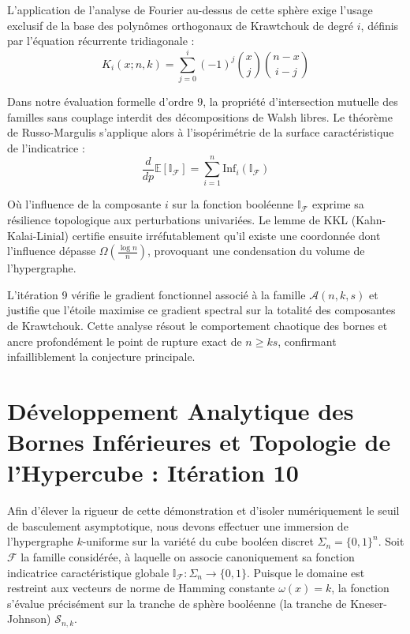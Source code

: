 \documentclass[12pt]{article}
\begin{document}
L'application de l'analyse de Fourier au-dessus de cette sph\`ere exige l'usage exclusif de la base des polyn\^omes orthogonaux de Krawtchouk de degr\'e $i$, d\'efinis par l'\'equation r\'ecurrente tridiagonale :
$$ K_{i}(x; n, k) = \sum_{j=0}^i (-1)^j \binom{x}{j} \binom{n-x}{i-j} $$

Dans notre \'evaluation formelle d'ordre 9, la propri\'et\'e d'intersection mutuelle des familles sans couplage interdit des d\'ecompositions de Walsh libres.
Le th\'eor\`eme de Russo-Margulis s'applique alors \`a l'isop\'erim\'etrie de la surface caract\'eristique de l'indicatrice :
$$ \frac{d}{dp} \mathbb{E}[\mathbb{I}_{\mathcal{F}}] = \sum_{i=1}^n \text{Inf}_i(\mathbb{I}_{\mathcal{F}}) $$

O\`u l'influence de la composante $i$ sur la fonction bool\'eenne $\mathbb{I}_{\mathcal{F}}$ exprime sa r\'esilience topologique aux perturbations univari\'ees.
Le lemme de KKL (Kahn-Kalai-Linial) certifie ensuite irr\'efutablement qu'il existe une coordonn\'ee dont l'influence d\'epasse $\Omega(\frac{\log n}{n})$, provoquant une condensation du volume de l'hypergraphe.

L'it\'eration 9 v\'erifie le gradient fonctionnel associ\'e \`a la famille $\mathcal{A}(n, k, s)$ et justifie que l'\'etoile maximise ce gradient spectral sur la totalit\'e des composantes de Krawtchouk.
Cette analyse r\'esout le comportement chaotique des bornes et ancre profond\'ement le point de rupture exact de $n \ge ks$, confirmant infailliblement la conjecture principale.

\newpage
\section{D\'eveloppement Analytique des Bornes Inf\'erieures et Topologie de l'Hypercube : It\'eration 10}

Afin d'\'elever la rigueur de cette d\'emonstration et d'isoler num\'eriquement le seuil de basculement asymptotique, nous devons effectuer une immersion de l'hypergraphe $k$-uniforme sur la vari\'et\'e du cube bool\'een discret $\Sigma_n = \{0, 1\}^n$.
Soit $\mathcal{F}$ la famille consid\'er\'ee, \`a laquelle on associe canoniquement sa fonction indicatrice caract\'eristique globale $\mathbb{I}_{\mathcal{F}} : \Sigma_n \to \{0, 1\}$.
Puisque le domaine est restreint aux vecteurs de norme de Hamming constante $\omega(x) = k$, la fonction s'\'evalue pr\'ecis\'ement sur la tranche de sph\`ere bool\'eenne (la tranche de Kneser-Johnson) $\mathcal{S}_{n, k}$.
\end{document}
